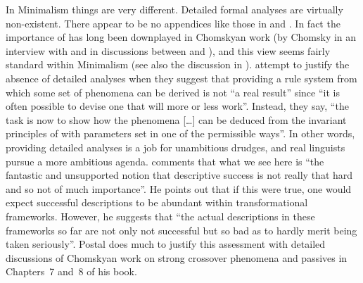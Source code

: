 \documentclass[output=paper]{langsci/langscibook}
\begin{document}
In Minimalism things are very different. Detailed formal analyses are virtually non-existent. There
appear to be no appendices like those in \citet{Sag97a} and \citet{GSag2000a-u}. In fact the
importance of  has long been downplayed in Chomskyan work (\eg by Chomsky in an interview
with
\citet[73]{HuybregtsRiemsdijk.1982} and in discussions between \citet{Pullum89b} and \citet[]{Chomsky90a}),
and this view seems fairly standard within Minimalism (see also the discussion in ). \citet[]{CL95a-u}
attempt to justify the absence of detailed analyses when they suggest that providing a rule 
system from which some set of phenomena can be derived is not ``a real result'' since ``it is often
possible to devise one that will more or less work''. Instead, they say, ``the task is now to show how
the phenomena [\ldots] can be deduced from the invariant principles of \ug with parameters set in one
of the permissible ways''. In other words, providing detailed analyses is a job for unambitious
drudges, and real linguists pursue a more ambitious agenda. \citet[5]{Postal2004a-u} comments that
what we see here is ``the fantastic and unsupported notion that descriptive success is not really
that hard and so not of much importance''. He points out that if this were true, one would expect
successful descriptions to be abundant within transformational frameworks. However, he suggests that
``the actual descriptions in these frameworks so far are not only not successful but so bad as to
hardly merit being taken seriously''. Postal does much to justify this assessment with detailed
discussions of Chomskyan work on strong crossover phenomena and passives in
Chapters~7 and~8 of his book. 
\end{document}
